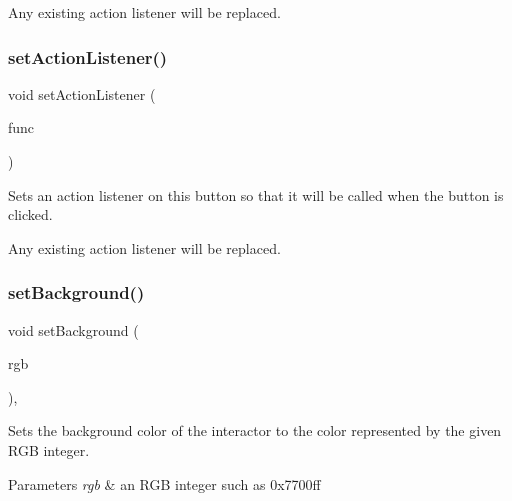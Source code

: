Any existing action listener will be replaced. \mbox{\label{classGButton_aebd20a89c7a8a43a6fce999cf4f9fcf2}} 
\subsubsection{\texorpdfstring{set\+Action\+Listener()}{setActionListener()}\hspace{0.1cm}{\footnotesize\ttfamily [2/2]}}
{\footnotesize\ttfamily void set\+Action\+Listener (\begin{DoxyParamCaption}\item[{G\+Event\+Listener\+Void}]{func }\end{DoxyParamCaption})\hspace{0.3cm}{\ttfamily [virtual]}}



Sets an action listener on this button so that it will be called when the button is clicked. 

Any existing action listener will be replaced. \mbox{\label{classGInteractor_acba7e546c2025c0a15ca4b4cc92043db}} 
\subsubsection{\texorpdfstring{set\+Background()}{setBackground()}\hspace{0.1cm}{\footnotesize\ttfamily [1/2]}}
{\footnotesize\ttfamily void set\+Background (\begin{DoxyParamCaption}\item[{int}]{rgb }\end{DoxyParamCaption})\hspace{0.3cm}{\ttfamily [virtual]}, {\ttfamily [inherited]}}



Sets the background color of the interactor to the color represented by the given R\+GB integer. 


\begin{DoxyParams}{Parameters}
{\em rgb} & an R\+GB integer such as 0x7700ff \\
\hline
\end{DoxyParams}


